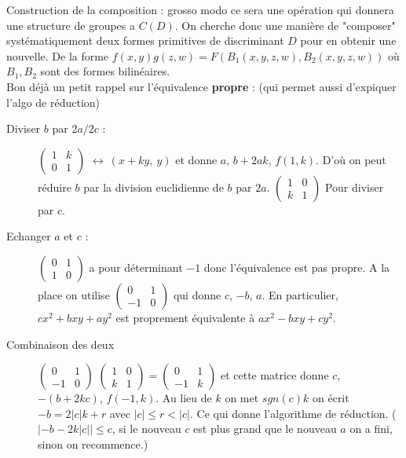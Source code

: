 \documentclass[12pt]{article}
\theoremstyle{plain}
\begin{document}
Construction de la composition : grosso modo ce sera une opération qui donnera une structure de groupes a $C(D)$.
On cherche donc une manière de "composer" systématiquement deux formes primitives de discriminant $D$ pour en obtenir une nouvelle.
De la forme $f(x,y)g(z,w)=F(B_1(x,y,z,w),B_2(x,y,z,w))$ où $B_1,B_2$ sont des formes bilinéaires.\\
Bon déjà un petit rappel sur l'équivalence \textbf{propre} : (qui permet aussi d'expiquer l'algo de réduction)
\begin{description}
    \item[Diviser $b$ par $2a/2c$ :] $\begin{pmatrix}
        1 & k\\
        0 & 1
    \end{pmatrix}$ $\leftrightarrow~(x+ky,~y)$ et donne $a$, $b+2ak$, $f(1, k)$. D'où on peut réduire $b$ par la division euclidienne de $b$ par $2a$. 
    $\begin{pmatrix}
        1 & 0\\
        k & 1
    \end{pmatrix}$ Pour diviser par $c$.

    \item[Echanger $a$ et $c$ :]
    $\begin{pmatrix}
        0 & 1\\
        1 & 0
    \end{pmatrix}$ a pour déterminant $-1$ donc l'équivalence est pas propre. A la place on utilise 
    $\begin{pmatrix}
        0 & 1\\
        -1 & 0
    \end{pmatrix}$ qui donne $c$, $-b$, $a$. En particulier, $cx^2+bxy+ay^2$ est proprement équivalente à $ax^2-bxy+cy^2$.
    \item[Combinaison des deux]
    $\begin{pmatrix}
        0 & 1\\
        -1 & 0
    \end{pmatrix}$
    $\begin{pmatrix}
        1 & 0\\
        k & 1
    \end{pmatrix}=\begin{pmatrix}
        0 & 1\\
        -1 & k
    \end{pmatrix}$ et cette matrice donne $c$, $-(b+2kc)$, $f(-1,k)$. Au lieu de $k$ on met $sgn(c)k$ on écrit $-b=2\lvert c\rvert k+r$ avec $\lvert c\rvert\leq r<\lvert c\rvert$.
    Ce qui donne l'algorithme de réduction. ($\lvert-b-2k\lvert c\rvert\rvert\leq c$, si le nouveau $c$ est plus grand que le nouveau $a$ on a fini, sinon on recommence.)
\end{description}
\end{document}

